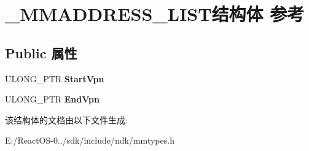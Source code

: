 \hypertarget{struct___m_m_a_d_d_r_e_s_s___l_i_s_t}{}\section{\+\_\+\+M\+M\+A\+D\+D\+R\+E\+S\+S\+\_\+\+L\+I\+S\+T结构体 参考}
\label{struct___m_m_a_d_d_r_e_s_s___l_i_s_t}
\subsection*{Public 属性}
\begin{DoxyCompactItemize}
\item 
\mbox{\label{struct___m_m_a_d_d_r_e_s_s___l_i_s_t_abafb8fc689626e7e2bf8f41c7231c457}} 
U\+L\+O\+N\+G\+\_\+\+P\+TR {\bfseries Start\+Vpn}
\item 
\mbox{\label{struct___m_m_a_d_d_r_e_s_s___l_i_s_t_a2ca132754c6f30a090148704997a7ea8}} 
U\+L\+O\+N\+G\+\_\+\+P\+TR {\bfseries End\+Vpn}
\end{DoxyCompactItemize}


该结构体的文档由以下文件生成\+:\begin{DoxyCompactItemize}
\item 
E\+:/\+React\+O\+S-\/0../sdk/include/ndk/mmtypes.\+h\end{DoxyCompactItemize}
